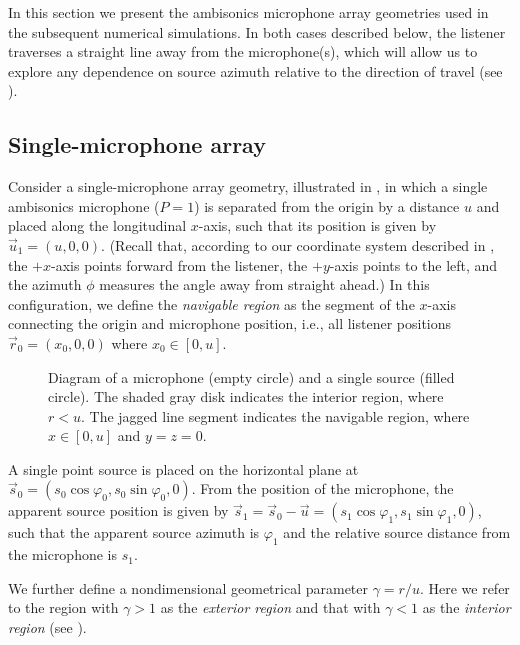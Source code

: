 In this section we present the ambisonics microphone array geometries used in the subsequent numerical simulations.
In both cases described below, the listener traverses a straight line away from the microphone(s), which will allow us to explore any dependence on source azimuth relative to the direction of travel (see ).

\subsection{Single-microphone array}\label{sec:06_Simulation_Framework:Point_Geometry}
Consider a single-microphone array geometry, illustrated in , in which a single ambisonics microphone ($P = 1$) is separated from the origin by a distance $u$ and placed along the longitudinal $x$-axis, such that its position is given by $\vec{u}_1 = (u,0,0)$.
(Recall that, according to our coordinate system described in , the $+x$-axis points forward from the listener, the $+y$-axis points to the left, and the azimuth $\phi$ measures the angle away from straight ahead.)
In this configuration, we define the \textit{navigable region} as the segment of the $x$-axis connecting the origin and microphone position, i.e., all listener positions $\vec{r}_0 = (x_0, 0, 0)$ where $x_0 \in [0,u]$.

\begin{figure}[t]
\centering
  
  \caption[Diagram of the array geometry for extrapolation simulations.]{
  Diagram of a microphone (empty circle) and a single source (filled circle).
  The shaded gray disk indicates the interior region, where $r < u$.
  The jagged line segment indicates the navigable region, where $x \in [0,u]$ and $y = z = 0$.}
  \label{fig:06_Simulation_Framework:Point_Geometry}
\end{figure}

A single point source is placed on the horizontal plane at $\vec{s}_0 = (s_0 \cos \varphi_0, s_0 \sin \varphi_0, 0)$.
From the position of the microphone, the apparent source position is given by
$\vec{s}_1 = \vec{s}_0 - \vec{u} = (s_1 \cos \varphi_1, s_1 \sin \varphi_1, 0)$,
such that the apparent source azimuth is $\varphi_1$ and the relative source distance from the microphone is $s_1$.

We further define a nondimensional geometrical parameter $\gamma = r / u$.
Here we refer to the region with $\gamma > 1$ as the \textit{exterior region} and that with $\gamma < 1$ as the \textit{interior region} (see ).

